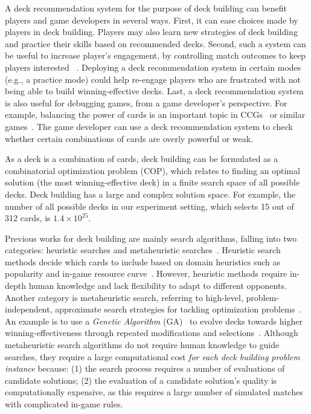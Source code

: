 
A deck recommendation system for the purpose of deck building can benefit players and game developers in several ways. First, it can ease choices made by players in deck building. Players may also learn new strategies of deck building and practice their skills based on recommended decks. Second, such a system can be useful to increase player's engagement, by controlling match outcomes to keep players interested ~\cite{chen2017eomm,chen2015analytics}. Deploying a deck recommendation system in certain modes (e.g., a practice mode) could help re-engage players who are frustrated with not being able to build winning-effective decks.  Last, a deck recommendation system is also useful for debugging games, from a game developer's perspective. For example,  balancing the power of cards is an important topic in CCGs~\cite{ham2010rarity} or similar games~\cite{mahlmann2012evolving}. The game developer can use a deck recommendation system to check whether certain combinations of cards are overly powerful or weak.


As a deck is a combination of cards, deck building can be formulated as a combinatorial optimization problem (COP), which relates to finding an optimal solution (the most winning-effective deck) in a finite search space of all possible decks. Deck building has a large and complex solution space. For example, the number of all possible decks in our experiment setting, which selects 15 out of 312 cards, is $1.4 \times 10^{25}$. 

Previous works for deck building are mainly search algorithms, falling into two categories: heuristic searches and metaheuristic searches~\cite{birattari2009tuning}. Heuristic search methods decide which cards to include based on domain heuristics such as popularity and in-game resource curve~\cite{frankkarsten,willfancher,stiegler2016hearthstone}. However, heuristic methods require in-depth human knowledge and lack flexibility to adapt to different opponents. Another category is metaheuristic search, referring to high-level, problem-independent, approximate search strategies for tackling optimization problems~\cite{birattari2009tuning}. An example is to use a \textit{Genetic Algorithm} (GA)~\cite{holland1992adaptation} to evolve decks towards higher winning-effectiveness through repeated modifications and selections~\cite{garcia2016evolutionary,bjorke2017deckbuilding}. Although metaheuristic search algorithms do not require human knowledge to guide searches, they require a large computational cost \textit{for each deck building problem instance} because: (1) the search process requires a number of evaluations of candidate solutions; (2) the evaluation of a candidate solution's quality is computationally expensive, as this requires a large number of simulated matches with complicated in-game rules. 

